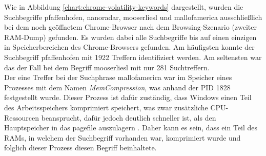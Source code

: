 Wie in Abbildung \ref{chart:chrome-volatility-keywords} dargestellt, wurden die Suchbegriffe \glqq{}pfaffenhofen\grqq{}, \glqq{}nanoradar\grqq{}, \glqq{}mooserliesl\grqq{} und \glqq{}mallofamerica\grqq{} ausschließlich bei dem noch geöffnetem Chrome-Browser nach dem Browsing-Szenario (zweiter RAM-Dump) gefunden. Es wurden dabei alle Suchbegriffe bis auf einen einzigen in Speicherbereichen des Chrome-Browsers gefunden. Am häufigsten konnte der Suchbegriff \glqq{}pfaffenhofen\grqq{} mit 1922 Treffern identifiziert werden. Am seltensten war das der Fall bei dem Begriff \glqq{}mooserliesl\grqq{} mit nur 281 Suchtreffern. \\
Der eine Treffer bei der Suchphrase \glqq{}mallofamerica\grqq{} war im Speicher eines Prozesses mit dem Namen \textit{MemCompression}, was anhand der PID 1828 festgestellt wurde. Dieser Prozess ist dafür zuständig, dass Windows einen Teil des Arbeitsspeichers komprimiert speichert, was zwar zusätzliche CPU-Ressourcen beansprucht, dafür jedoch deutlich schneller ist, als den Hauptspeicher in das pagefile auszulagern \cite{MemCompressionWebsite}. Daher kann es sein, dass ein Teil des RAMs, in welchem der Suchbegriff vorhanden war, komprimiert wurde und folglich dieser Prozess diesen Begriff beinhaltete.

